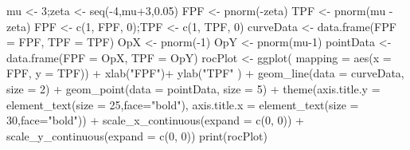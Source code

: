 \documentclass[
]{book}
\newenvironment{Shaded}{\begin{snugshade}}{\end{snugshade}}
\newcommand{\AttributeTok}[1]{\textcolor[rgb]{0.77,0.63,0.00}{#1}}
\newcommand{\DecValTok}[1]{\textcolor[rgb]{0.00,0.00,0.81}{#1}}
\newcommand{\FloatTok}[1]{\textcolor[rgb]{0.00,0.00,0.81}{#1}}
\newcommand{\FunctionTok}[1]{\textcolor[rgb]{0.00,0.00,0.00}{#1}}
\newcommand{\NormalTok}[1]{#1}
\newcommand{\OtherTok}[1]{\textcolor[rgb]{0.56,0.35,0.01}{#1}}
\newcommand{\SpecialCharTok}[1]{\textcolor[rgb]{0.00,0.00,0.00}{#1}}
\newcommand{\StringTok}[1]{\textcolor[rgb]{0.31,0.60,0.02}{#1}}
\begin{document}
\begin{Shaded}
\begin{Highlighting}[]
\NormalTok{mu }\OtherTok{\textless{}{-}} \DecValTok{3}\NormalTok{;zeta }\OtherTok{\textless{}{-}} \FunctionTok{seq}\NormalTok{(}\SpecialCharTok{{-}}\DecValTok{4}\NormalTok{,mu}\SpecialCharTok{+}\DecValTok{3}\NormalTok{,}\FloatTok{0.05}\NormalTok{)}
\NormalTok{FPF }\OtherTok{\textless{}{-}} \FunctionTok{pnorm}\NormalTok{(}\SpecialCharTok{{-}}\NormalTok{zeta)}
\NormalTok{TPF }\OtherTok{\textless{}{-}} \FunctionTok{pnorm}\NormalTok{(mu }\SpecialCharTok{{-}}\NormalTok{zeta) }
\NormalTok{FPF }\OtherTok{\textless{}{-}} \FunctionTok{c}\NormalTok{(}\DecValTok{1}\NormalTok{, FPF, }\DecValTok{0}\NormalTok{);TPF }\OtherTok{\textless{}{-}} \FunctionTok{c}\NormalTok{(}\DecValTok{1}\NormalTok{, TPF, }\DecValTok{0}\NormalTok{)}
\NormalTok{curveData }\OtherTok{\textless{}{-}} \FunctionTok{data.frame}\NormalTok{(}\AttributeTok{FPF =}\NormalTok{ FPF, }\AttributeTok{TPF =}\NormalTok{ TPF)}
\NormalTok{OpX }\OtherTok{\textless{}{-}} \FunctionTok{pnorm}\NormalTok{(}\SpecialCharTok{{-}}\DecValTok{1}\NormalTok{)}
\NormalTok{OpY }\OtherTok{\textless{}{-}} \FunctionTok{pnorm}\NormalTok{(mu}\DecValTok{{-}1}\NormalTok{)}
\NormalTok{pointData }\OtherTok{\textless{}{-}} \FunctionTok{data.frame}\NormalTok{(}\AttributeTok{FPF =}\NormalTok{ OpX, }\AttributeTok{TPF =}\NormalTok{ OpY)}
\NormalTok{rocPlot }\OtherTok{\textless{}{-}} \FunctionTok{ggplot}\NormalTok{(}
  \AttributeTok{mapping =} \FunctionTok{aes}\NormalTok{(}\AttributeTok{x =}\NormalTok{ FPF, }\AttributeTok{y =}\NormalTok{ TPF)) }\SpecialCharTok{+} 
  \FunctionTok{xlab}\NormalTok{(}\StringTok{"FPF"}\NormalTok{)}\SpecialCharTok{+} \FunctionTok{ylab}\NormalTok{(}\StringTok{"TPF"}\NormalTok{ ) }\SpecialCharTok{+} 
  \FunctionTok{geom\_line}\NormalTok{(}\AttributeTok{data =}\NormalTok{ curveData, }\AttributeTok{size =} \DecValTok{2}\NormalTok{) }\SpecialCharTok{+} 
  \FunctionTok{geom\_point}\NormalTok{(}\AttributeTok{data =}\NormalTok{ pointData, }\AttributeTok{size =} \DecValTok{5}\NormalTok{) }\SpecialCharTok{+}
  \FunctionTok{theme}\NormalTok{(}\AttributeTok{axis.title.y =} \FunctionTok{element\_text}\NormalTok{(}\AttributeTok{size =} \DecValTok{25}\NormalTok{,}\AttributeTok{face=}\StringTok{"bold"}\NormalTok{),}
        \AttributeTok{axis.title.x =} \FunctionTok{element\_text}\NormalTok{(}\AttributeTok{size =} \DecValTok{30}\NormalTok{,}\AttributeTok{face=}\StringTok{"bold"}\NormalTok{))  }\SpecialCharTok{+}
  \FunctionTok{scale\_x\_continuous}\NormalTok{(}\AttributeTok{expand =} \FunctionTok{c}\NormalTok{(}\DecValTok{0}\NormalTok{, }\DecValTok{0}\NormalTok{)) }\SpecialCharTok{+} 
  \FunctionTok{scale\_y\_continuous}\NormalTok{(}\AttributeTok{expand =} \FunctionTok{c}\NormalTok{(}\DecValTok{0}\NormalTok{, }\DecValTok{0}\NormalTok{)) }
\FunctionTok{print}\NormalTok{(rocPlot)}
\end{Highlighting}
\end{Shaded}
\end{document}
